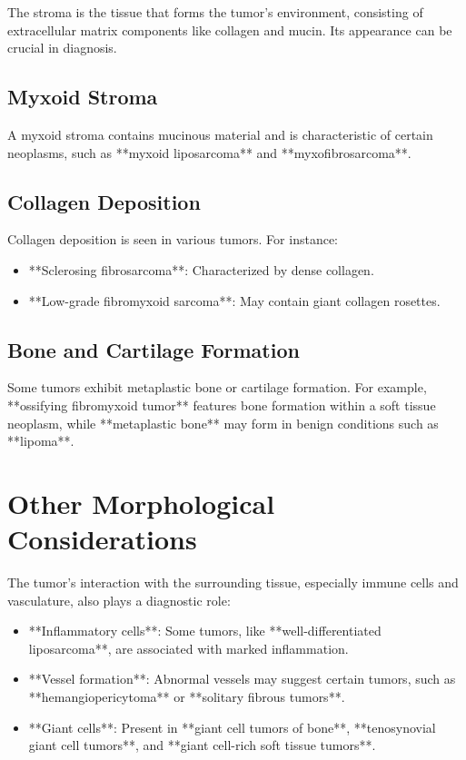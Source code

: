 The stroma is the tissue that forms the tumor's environment, consisting of extracellular matrix components like collagen and mucin. Its appearance can be crucial in diagnosis.

\subsection{Myxoid Stroma}
A myxoid stroma contains mucinous material and is characteristic of certain neoplasms, such as **myxoid liposarcoma** and **myxofibrosarcoma**.

\subsection{Collagen Deposition}
Collagen deposition is seen in various tumors. For instance:
\begin{itemize}
    \item **Sclerosing fibrosarcoma**: Characterized by dense collagen.
    \item **Low-grade fibromyxoid sarcoma**: May contain giant collagen rosettes.
\end{itemize}

\subsection{Bone and Cartilage Formation}
Some tumors exhibit metaplastic bone or cartilage formation. For example, **ossifying fibromyxoid tumor** features bone formation within a soft tissue neoplasm, while **metaplastic bone** may form in benign conditions such as **lipoma**.

\section{Other Morphological Considerations}
The tumor's interaction with the surrounding tissue, especially immune cells and vasculature, also plays a diagnostic role:
\begin{itemize}
    \item **Inflammatory cells**: Some tumors, like **well-differentiated liposarcoma**, are associated with marked inflammation.
    \item **Vessel formation**: Abnormal vessels may suggest certain tumors, such as **hemangiopericytoma** or **solitary fibrous tumors**.
    \item **Giant cells**: Present in **giant cell tumors of bone**, **tenosynovial giant cell tumors**, and **giant cell-rich soft tissue tumors**.
\end{itemize}

